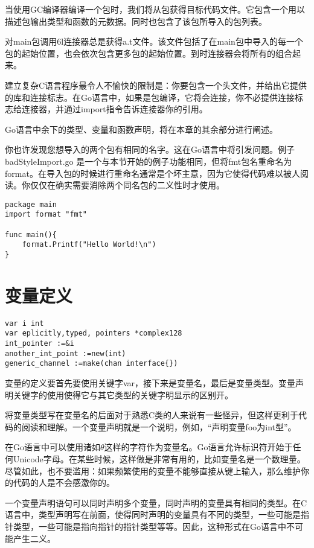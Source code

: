 当使用GC编译器编译一个包时，我们将从包获得目标代码文件。它包含一个用以描述包输出类型和函数的元数据。同时也包含了该包所导入的包列表。

对main包调用6l连接器总是获得a.t文件。该文件包括了在main包中导入的每一个包的起始位置，也会依次包含更多包的起始位置。到时连接器会将所有的组合起来。

建立复杂C语言程序最令人不愉快的限制是：你要包含一个头文件，并给出它提供的库和连接标志。在Go语言中，如果是包编译，它将会连接，你不必提供连接标志给连接器，并通过import指令告诉连接器你的引用。

Go语言中余下的类型、变量和函数声明，将在本章的其余部分进行阐述。

你也许发现您想导入的两个包有相同的名字。这在Go语言中将引发问题。例子badStyleImport.go 是一个与本节开始的例子功能相同，但将fmt包名重命名为format。在导入包的时候进行重命名通常是个坏主意，因为它使得代码难以被人阅读。你仅仅在确实需要消除两个同名包的二义性时才使用。

\begin{lstlisting}
package main
import format "fmt"

func main(){
	format.Printf("Hello World!\n")
}
\end{lstlisting}

\section{变量定义}
\begin{lstlisting}
var i int
var eplicitly,typed, pointers *complex128
int_pointer :=&i 
another_int_point :=new(int)
generic_channel :=make(chan interface{})
\end{lstlisting}

变量的定义要首先要使用关键字var，接下来是变量名，最后是变量类型。变量声明关键字的使用使得它与其它类型的关键字明显示的区别开。

将变量类型写在变量名的后面对于熟悉C类的人来说有一些怪异，但这样更利于代码的阅读和理解。一个变量声明就是一个说明，例如，“声明变量foo为int型”。

在Go语言中可以使用诸如$\theta$这样的字符作为变量名。Go语言允许标识符开始于任何Unicode字母。在某些时候，这样做是非常有用的，比如变量名是一个数理量。尽管如此，也不要滥用：如果频繁使用的变量不能够直接从键上输入，那么维护你的代码的人是不会感激你的。

一个变量声明语句可以同时声明多个变量，同时声明的变量具有相同的类型。在C语言中，类型声明写在前面，使得同时声明的变量具有不同的类型，一些可能是指针类型，一些可能是指向指针的指针类型等等。因此，这种形式在Go语言中不可能产生二义。

